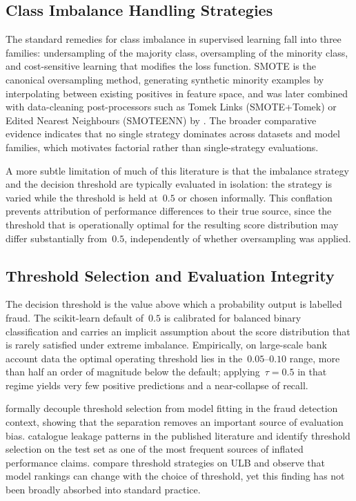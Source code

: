 \documentclass[a4paper,fleqn]{cas-sc}
\begin{document}
\subsection{Class Imbalance Handling Strategies}

The standard remedies for class imbalance in supervised learning fall into three
families: undersampling of the majority class, oversampling of the minority class, and
cost-sensitive learning that modifies the loss function. SMOTE \citep{chawla2002smote}
is the canonical oversampling method, generating synthetic minority examples by
interpolating between existing positives in feature space, and was later combined with
data-cleaning post-processors such as Tomek Links (SMOTE+Tomek) or Edited Nearest
Neighbours (SMOTEENN) by \citet{batista2004balancing}. The broader comparative
evidence \citep{hegarcia2009learning, fernandez2018smote} indicates that no single
strategy dominates across datasets and model families, which motivates factorial rather
than single-strategy evaluations.

A more subtle limitation of much of this literature is that the imbalance strategy and
the decision threshold are typically evaluated in isolation: the strategy is varied
while the threshold is held at~$0.5$ or chosen informally. This conflation prevents
attribution of performance differences to their true source, since the threshold that
is operationally optimal for the resulting score distribution may differ substantially
from~$0.5$, independently of whether oversampling was applied.

\subsection{Threshold Selection and Evaluation Integrity}

The decision threshold is the value above which a probability output is labelled fraud.
The scikit-learn default of~$0.5$ is calibrated for balanced binary classification and
carries an implicit assumption about the score distribution that is rarely satisfied
under extreme imbalance. Empirically, on large-scale bank account data the optimal
operating threshold lies in the~$0.05$--$0.10$ range, more than half an order of
magnitude below the default; applying~$\tau=0.5$ in that regime yields very few
positive predictions and a near-collapse of recall.

\citet{luzio2024decoupling} formally decouple threshold selection from model fitting
in the fraud detection context, showing that the separation removes an important source
of evaluation bias.
\citet{hayat2025leakage} catalogue leakage patterns in the published literature and
identify threshold selection on the test set as one of the most frequent sources of
inflated performance claims.
\citet{dalpozzolo2017realistic} compare threshold strategies on ULB and observe that
model rankings can change with the choice of threshold, yet this finding has not been
broadly absorbed into standard practice.
\end{document}
